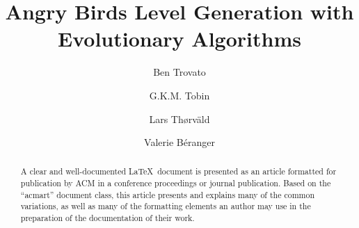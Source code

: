 \documentclass[manuscript,screen,review]{acmart}
\begin{document}
\title{Angry Birds Level Generation with Evolutionary Algorithms}

\author{Ben Trovato}

\author{G.K.M. Tobin}
\authornotemark[1]

\author{Lars Th{\o}rv{\"a}ld}

\author{Valerie B\'eranger}


\renewcommand{\shortauthors}{Trovato et al.}

\begin{abstract}
  A clear and well-documented \LaTeX\ document is presented as an
  article formatted for publication by ACM in a conference proceedings
  or journal publication. Based on the ``acmart'' document class, this
  article presents and explains many of the common variations, as well
  as many of the formatting elements an author may use in the
  preparation of the documentation of their work.
\end{abstract}
\end{document}
